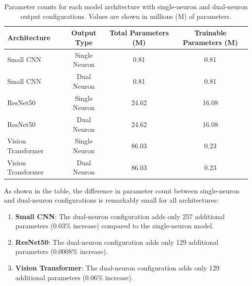 \begin{table}[htbp]
\centering
\begin{tabular}{lccc}
\hline
\textbf{Architecture} & \textbf{Output Type} & \textbf{Total Parameters (M)} & \textbf{Trainable Parameters (M)} \\
\hline
Small CNN & Single Neuron & 0.81 & 0.81 \\
Small CNN & Dual Neuron & 0.81 & 0.81 \\
\hline
ResNet50 & Single Neuron & 24.62 & 16.08 \\
ResNet50 & Dual Neuron & 24.62 & 16.08 \\
\hline
Vision Transformer & Single Neuron & 86.03 & 0.23 \\
Vision Transformer & Dual Neuron & 86.03 & 0.23 \\
\hline
\end{tabular}
\caption{Parameter counts for each model architecture with single-neuron and dual-neuron output configurations. Values are shown in millions (M) of parameters.}
\label{tab:parameter_counts}
\end{table}

As shown in the table, the difference in parameter count between single-neuron and dual-neuron configurations is remarkably small for all architectures:

\begin{enumerate}
\item \textbf{Small CNN}: The dual-neuron configuration adds only 257 additional parameters (0.03\% increase) compared to the single-neuron model.

\item \textbf{ResNet50}: The dual-neuron configuration adds only 129 additional parameters (0.0008\% increase).

\item \textbf{Vision Transformer}: The dual-neuron configuration adds only 129 additional parameters (0.06\% increase).
\end{enumerate}

